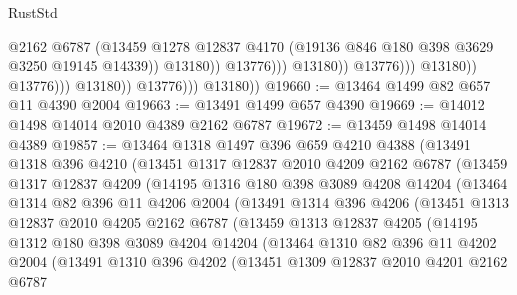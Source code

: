\begin{lexlean}{RustStd}
\begin{coremodule}
                                                @2162
                                                @6787
                                                (@13459
                                                  @1278
                                                  @12837
                                                  @4170
                                                  (@19136 @846 @180 @398 @3629 @3250 @19145 @14339))
                                                @13180))
                                            @13776)))
                                      @13180))
                                  @13776)))
                            @13180))
                        @13776)))
                  @13180))
              @13776)))
        @13180))
@19660 := @13464 @1499 @82 @657 @11 @4390 @2004
@19663 := @13491 @1499 @657 @4390
@19669 := @14012 @1498 @14014 @2010 @4389 @2162 @6787
@19672 := @13459 @1498 @14014 @4389
@19857 := @13464
    @1318
    @1497
    @396
    @659
    @4210
    @4388
    (@13491
      @1318
      @396
      @4210
      (@13451
        @1317
        @12837
        @2010
        @4209
        @2162
        @6787
        (@13459
          @1317
          @12837
          @4209
          (@14195
            @1316
            @180
            @398
            @3089
            @4208
            @14204
            (@13464
              @1314
              @82
              @396
              @11
              @4206
              @2004
              (@13491
                @1314
                @396
                @4206
                (@13451
                  @1313
                  @12837
                  @2010
                  @4205
                  @2162
                  @6787
                  (@13459
                    @1313
                    @12837
                    @4205
                    (@14195
                      @1312
                      @180
                      @398
                      @3089
                      @4204
                      @14204
                      (@13464
                        @1310
                        @82
                        @396
                        @11
                        @4202
                        @2004
                        (@13491
                          @1310
                          @396
                          @4202
                          (@13451
                            @1309
                            @12837
                            @2010
                            @4201
                            @2162
                            @6787

\end{coremodule}
\end{lexlean}
